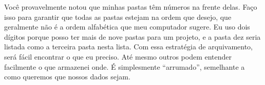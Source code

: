 \documentclass[
]{book}
\begin{document}
Você provavelmente notou que minhas pastas têm números na frente delas. Faço isso para garantir que todas as pastas estejam na ordem que desejo, que geralmente não é a ordem alfabética que meu computador sugere. Eu uso dois dígitos porque posso ter mais de nove pastas para um projeto, e a pasta dez seria listada como a terceira pasta nesta lista. Com essa estratégia de arquivamento, será fácil encontrar o que eu preciso. Até mesmo outros podem entender facilmente o que armazenei onde. É simplesmente ``arrumado'', semelhante a como queremos que nossos dados sejam.

  
\end{document}
